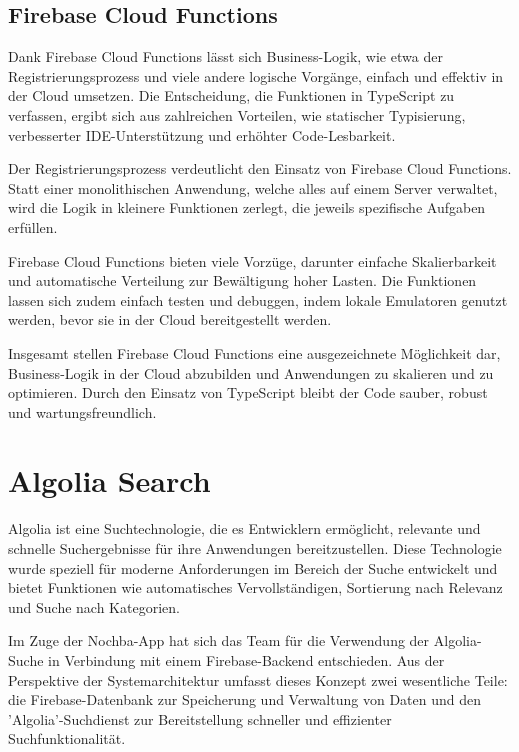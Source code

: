 \subsection{Firebase Cloud Functions}
Dank Firebase Cloud Functions\cite{firebase-cloud-functions} lässt sich Business-Logik, wie etwa der Registrierungsprozess und viele andere logische Vorgänge, einfach und effektiv in der Cloud umsetzen. Die Entscheidung, die Funktionen in TypeScript zu verfassen, ergibt sich aus zahlreichen Vorteilen, wie statischer Typisierung, verbesserter IDE-Unterstützung und erhöhter Code-Lesbarkeit.

Der Registrierungsprozess verdeutlicht den Einsatz von Firebase Cloud Functions. Statt einer monolithischen Anwendung, welche alles auf einem Server verwaltet, wird die Logik in kleinere Funktionen zerlegt, die jeweils spezifische Aufgaben erfüllen.

Firebase Cloud Functions bieten viele Vorzüge, darunter einfache Skalierbarkeit und automatische Verteilung zur Bewältigung hoher Lasten. Die Funktionen lassen sich zudem einfach testen und debuggen, indem lokale Emulatoren genutzt werden, bevor sie in der Cloud bereitgestellt werden.

Insgesamt stellen Firebase Cloud Functions eine ausgezeichnete Möglichkeit dar, Business-Logik in der Cloud abzubilden und Anwendungen zu skalieren und zu optimieren. Durch den Einsatz von TypeScript bleibt der Code sauber, robust und wartungsfreundlich.

\section{Algolia Search}\label{sec:algolia}

Algolia ist eine Suchtechnologie, die es Entwicklern ermöglicht, relevante und schnelle Suchergebnisse für ihre Anwendungen bereitzustellen. Diese Technologie wurde speziell für moderne Anforderungen im Bereich der Suche entwickelt und bietet Funktionen wie automatisches Vervollständigen, Sortierung nach Relevanz und Suche nach Kategorien.

Im Zuge der Nochba-App hat sich das Team für die Verwendung der Algolia-Suche in Verbindung mit einem Firebase-Backend entschieden. Aus der Perspektive der Systemarchitektur umfasst dieses Konzept zwei wesentliche Teile: die Firebase-Datenbank zur Speicherung und Verwaltung von Daten und den 'Algolia'-Suchdienst zur Bereitstellung schneller und effizienter Suchfunktionalität.

